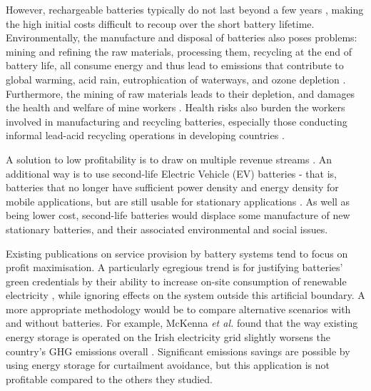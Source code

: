 \documentclass[report_18month.tex]{subfiles}
\begin{document}
However, rechargeable batteries typically do not last beyond a few years \citep{luo2015overview}, making the high initial costs difficult to recoup over the short battery lifetime. \citep{zhang2017sweden,abdulla2017aus,nottrott2013pvbatt,stadler2009expensiveco2} Environmentally, the manufacture and disposal of batteries also poses problems: mining and refining the raw materials, processing them, recycling at the end of battery life, all consume energy and thus lead to emissions that contribute to global warming, acid rain, eutrophication of waterways, and ozone depletion \citep{romare2017life,peters2017aqueous}. Furthermore, the mining of raw materials leads to their depletion, and damages the health and welfare of mine workers \citep{mcmanus2012lithium}. Health risks also burden the workers involved in manufacturing and recycling batteries, especially those conducting informal lead-acid recycling operations in developing countries \citep{haefliger2009leadpoison,gottesfeld2011lead}.

A solution to low profitability is to draw on multiple revenue streams \citep{tsagkou2017stack,moreno2015milp}. An additional way is to use second-life Electric Vehicle (EV) batteries - that is, batteries that no longer have sufficient power density and energy density for mobile applications, but are still usable for stationary applications \citep{gaines2014evbatt,jiao2016evbiz}. As well as being lower cost, second-life batteries would displace some manufacture of new stationary batteries, and their associated environmental and social issues.

Existing publications on service provision by battery systems tend to focus on profit maximisation. A particularly egregious trend is for justifying batteries' green credentials by their ability to increase on-site consumption of renewable electricity \citep{zhang2017sweden,hoppmann2014selfcons,weniger2013sizing}, while ignoring effects on the system outside this artificial boundary. A more appropriate methodology would be to compare alternative scenarios with and without batteries. For example, McKenna \emph{et al.} found that the way existing energy storage is operated on the Irish electricity grid slightly worsens the country's GHG emissions overall \citep{mckenna2017eir}. Significant emissions savings are possible by using energy storage for curtailment avoidance, but this application is not profitable compared to the others they studied.
\end{document}
